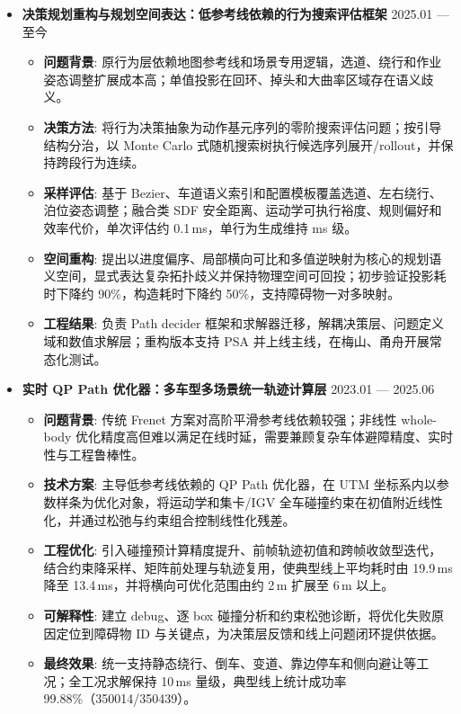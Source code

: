 \documentclass[zh]{resume}
\begin{document}
\begin{itemize}
  \item \textbf{决策规划重构与规划空间表达：低参考线依赖的行为搜索评估框架} \hfill 2025.01 --- 至今
  \begin{itemize}
    \item \textbf{问题背景}: 原行为层依赖地图参考线和场景专用逻辑，选道、绕行和作业姿态调整扩展成本高；单值投影在回环、掉头和大曲率区域存在语义歧义。
    \item \textbf{决策方法}: 将行为决策抽象为动作基元序列的零阶搜索评估问题；按引导结构分治，以 Monte Carlo 式随机搜索树执行候选序列展开/rollout，并保持跨段行为连续。
    \item \textbf{采样评估}: 基于 Bezier、车道语义索引和配置模板覆盖选道、左右绕行、泊位姿态调整；融合类 SDF 安全距离、运动学可执行裕度、规则偏好和效率代价，单次评估约 0.1\,ms，单行为生成维持 ms 级。
    \item \textbf{空间重构}: 提出以进度偏序、局部横向可比和多值逆映射为核心的规划语义空间，显式表达复杂拓扑歧义并保持物理空间可回投；初步验证投影耗时下降约 90\%，构造耗时下降约 50\%，支持障碍物一对多映射。
    \item \textbf{工程结果}: 负责 Path decider 框架和求解器迁移，解耦决策层、问题定义域和数值求解层；重构版本支持 PSA 并上线主线，在梅山、甬舟开展常态化测试。
  \end{itemize}

  \newpage
  \item \textbf{实时 QP Path 优化器：多车型多场景统一轨迹计算层} \hfill 2023.01 --- 2025.06
  \begin{itemize}
    \item \textbf{问题背景}: 传统 Frenet 方案对高阶平滑参考线依赖较强；非线性 whole-body 优化精度高但难以满足在线时延，需要兼顾复杂车体避障精度、实时性与工程鲁棒性。
    \item \textbf{技术方案}: 主导低参考线依赖的 QP Path 优化器，在 UTM 坐标系内以参数样条为优化对象，将运动学和集卡/IGV 全车碰撞约束在初值附近线性化，并通过松弛与约束组合控制线性化残差。
    \item \textbf{工程优化}: 引入碰撞预计算精度提升、前帧轨迹初值和跨帧收敛型迭代，结合约束降采样、矩阵前处理与轨迹复用，使典型线上平均耗时由 19.9\,ms 降至 13.4\,ms，并将横向可优化范围由约 2\,m 扩展至 6\,m 以上。
    \item \textbf{可解释性}: 建立 debug、逐 box 碰撞分析和约束松弛诊断，将优化失败原因定位到障碍物 ID 与关键点，为决策层反馈和线上问题闭环提供依据。
    \item \textbf{最终效果}: 统一支持静态绕行、倒车、变道、靠边停车和侧向避让等工况；全工况求解保持 10\,ms 量级，典型线上统计成功率 99.88\%（350014/350439）。
  \end{itemize}


\end{itemize}
\end{document}
